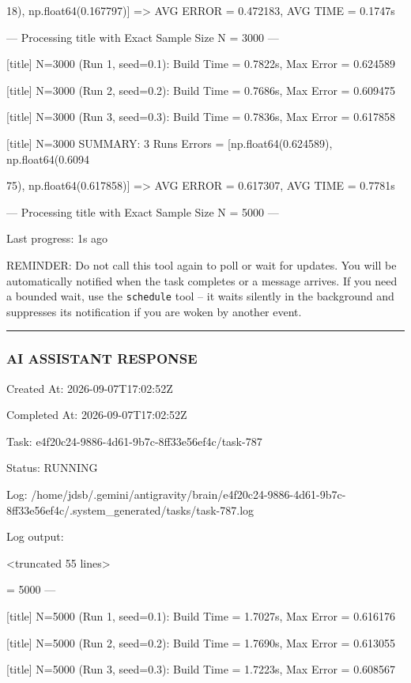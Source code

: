 \documentclass[11pt,a4paper]{article}
\begin{document}
18), np.float64(0.167797)] => AVG ERROR = 0.472183, AVG TIME = 0.1747s

--- Processing title with Exact Sample Size N = 3000 ---

[title] N=3000 (Run 1, seed=0.1): Build Time = 0.7822s, Max Error = 0.624589

[title] N=3000 (Run 2, seed=0.2): Build Time = 0.7686s, Max Error = 0.609475

[title] N=3000 (Run 3, seed=0.3): Build Time = 0.7836s, Max Error = 0.617858

[title] N=3000 SUMMARY: 3 Runs Errors = [np.float64(0.624589), np.float64(0.6094

75), np.float64(0.617858)] => AVG ERROR = 0.617307, AVG TIME = 0.7781s

--- Processing title with Exact Sample Size N = 5000 ---


Last progress: 1s ago



REMINDER: Do not call this tool again to poll or wait for updates. You will be automatically notified when the task completes or a message arrives. If you need a bounded wait, use the \texttt{schedule} tool -- it waits silently in the background and suppresses its notification if you are woken by another event.


\hrule

\subsubsection{AI ASSISTANT RESPONSE}

Created At: 2026-09-07T17:02:52Z

Completed At: 2026-09-07T17:02:52Z

Task: e4f20c24-9886-4d61-9b7c-8ff33e56ef4c/task-787

Status: RUNNING

Log: /home/jdsb/.gemini/antigravity/brain/e4f20c24-9886-4d61-9b7c-8ff33e56ef4c/.system\_generated/tasks/task-787.log

Log output:

<truncated 55 lines>

= 5000 ---

[title] N=5000 (Run 1, seed=0.1): Build Time = 1.7027s, Max Error = 0.616176

[title] N=5000 (Run 2, seed=0.2): Build Time = 1.7690s, Max Error = 0.613055

[title] N=5000 (Run 3, seed=0.3): Build Time = 1.7223s, Max Error = 0.608567
\end{document}
